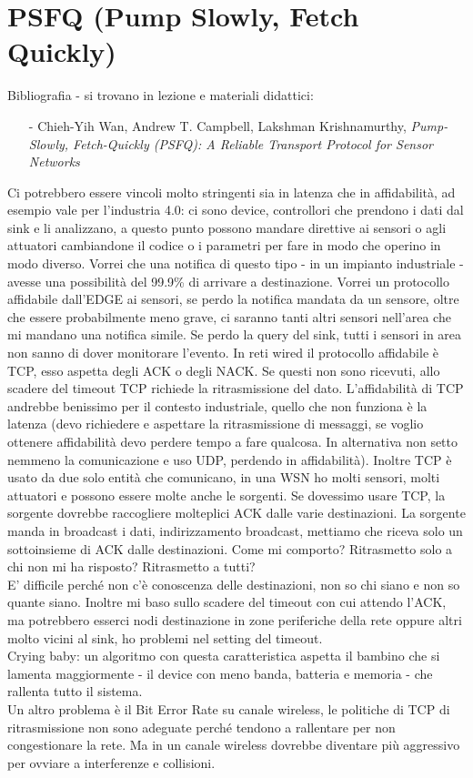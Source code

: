 \documentclass[12pt,italian]{report}
\begin{document}
\chapter{PSFQ (Pump Slowly, Fetch Quickly)}
\label{cap:ptaw}
Bibliografia - si trovano in lezione e materiali didattici: 
\begin{itemize}
    \item[-] Chieh-Yih Wan, Andrew T. Campbell, Lakshman Krishnamurthy, \textit{Pump-Slowly, Fetch-Quickly (PSFQ): A Reliable Transport Protocol for Sensor Networks}
\end{itemize}
\bigbreak
Ci potrebbero essere vincoli molto stringenti sia in latenza che in affidabilità, ad esempio vale per l'industria 4.0: ci sono device, controllori che prendono i dati dal sink e li analizzano, a questo punto possono mandare direttive ai sensori o agli attuatori cambiandone il codice o i parametri per fare in modo che operino in modo diverso. Vorrei che una notifica di questo tipo - in un impianto industriale - avesse una possibilità del 99.9\% di arrivare a destinazione. Vorrei un protocollo affidabile dall'EDGE ai sensori, se perdo la notifica mandata da un sensore, oltre che essere probabilmente meno grave, ci saranno tanti altri sensori nell'area che mi mandano una notifica simile. Se perdo la query del sink, tutti i sensori in area non sanno di dover monitorare l'evento. 
\bigbreak
In reti wired il protocollo affidabile è TCP, esso aspetta degli ACK o degli NACK. Se questi non sono ricevuti, allo scadere del timeout TCP richiede la ritrasmissione del dato. L'affidabilità di TCP andrebbe benissimo per il contesto industriale, quello che non funziona è la latenza (devo richiedere e aspettare la ritrasmissione di messaggi, se voglio ottenere affidabilità devo perdere tempo a fare qualcosa. In alternativa non setto nemmeno la comunicazione e uso UDP, perdendo in affidabilità). Inoltre TCP è usato da due solo entità che comunicano, in una WSN ho molti sensori, molti attuatori e possono essere molte anche le sorgenti. Se dovessimo usare TCP, la sorgente dovrebbe raccogliere molteplici ACK dalle varie destinazioni. La sorgente manda in broadcast i dati, indirizzamento broadcast, mettiamo che riceva solo un sottoinsieme di ACK dalle destinazioni. Come mi comporto? Ritrasmetto solo a chi non mi ha risposto? Ritrasmetto a tutti? \\ E' difficile perché non c'è conoscenza delle destinazioni, non so chi siano e non so quante siano. Inoltre mi baso sullo scadere del timeout con cui attendo l'ACK, ma potrebbero esserci nodi destinazione in zone periferiche della rete oppure altri molto vicini al sink, ho problemi nel setting del timeout. \\ Crying baby: un algoritmo con questa caratteristica aspetta il bambino che si lamenta maggiormente - il device con meno banda, batteria e memoria - che rallenta tutto il sistema. \\ Un altro problema è il Bit Error Rate su canale wireless, le politiche di TCP di ritrasmissione non sono adeguate perché tendono a rallentare per non congestionare la rete. Ma in un canale wireless dovrebbe diventare più aggressivo per ovviare a interferenze e collisioni. 
\end{document}
